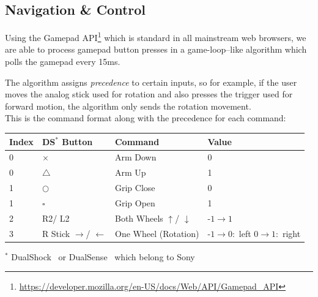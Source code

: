 \documentclass[a4paper,12pt]{article}
\newcommand{\sz}{\text{-}}
\begin{document}
\subsection{Navigation \& Control}

Using the Gamepad API\footnote{\url{https://developer.mozilla.org/en-US/docs/Web/API/Gamepad_API}} which is standard in all mainstream web browsers, we are able to process gamepad button presses in a game-loop--like algorithm which polls the gamepad every 15ms.

The algorithm assigns \textit{precedence} to certain inputs, so for example, if the user moves the analog stick used for rotation and also presses the trigger used for forward motion, the algorithm only sends the rotation movement.\\
This is the command format along with the precedence for each command:
\begin{center}
    \bgroup
    \def\arraystretch{1.5}
    {
        \begin{tabular}{|l|l|l|p{6em}|}
            \hline
            \textbf{Index} & \textbf{DS$^*$ Button}              & \textbf{Command}                     & \textbf{Value}                                                \\
            \hline
            0              & $\times$                            & Arm Down                             & 0                                                             \\
            \hline
            0              & $\triangle$                         & Arm Up                               & 1                                                             \\
            \hline
            1              & $\bigcirc$                          & Grip Close                           & 0                                                             \\
            \hline
            1              & $\square$                           & Grip Open                            & 1                                                             \\
            \hline
            2              & R2/ L2                              & Both Wheels $\uparrow$/ $\downarrow$ & $\sz1 \rightarrow 1$                                          \\
            \hline
            3              & R Stick $\rightarrow$/ $\leftarrow$ & One Wheel (Rotation)                 & $\sz1 \rightarrow 0 :$ left \newline $0 \rightarrow 1:$ right \\
            \hline
        \end{tabular}}
    \egroup

    \footnotesize{$^*$ DualShock \textregistered\ or DualSense \textregistered\ which belong to Sony \texttrademark}\\
\end{center}
\end{document}
